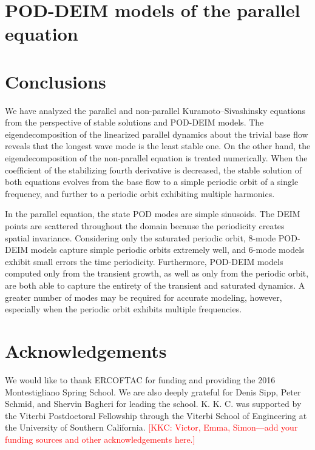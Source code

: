 \documentclass[11pt]{article}
\newcommand{\KSE}{Kuramoto--Sivashinsky equation}
\newcommand{\kkc}[1]{\textcolor{red}{[KKC: #1]}}
\begin{document}
\section{POD-DEIM models of the parallel equation}
\label{sec:pod-deim}

\section{Conclusions}
\label{sec:conclusions}

We have analyzed the parallel and non-parallel {\KSE}s from the perspective of stable solutions and POD-DEIM models.
The eigendecomposition of the linearized parallel dynamics about the trivial base flow reveals that the longest wave mode is the least stable one.
On the other hand, the eigendecomposition of the non-parallel equation is treated numerically.
When the coefficient of the stabilizing fourth derivative is decreased, the stable solution of both equations evolves from the base flow to a simple periodic orbit of a single frequency, and further to a periodic orbit exhibiting multiple harmonics.

In the parallel equation, the state POD modes are simple sinusoids.
The DEIM points are scattered throughout the domain because the periodicity creates spatial invariance.
Considering only the saturated periodic orbit, 8-mode POD-DEIM models capture simple periodic orbits extremely well, and 6-mode models exhibit small errors the time periodicity.
Furthermore, POD-DEIM models computed only from the transient growth, as well as only from the periodic orbit, are both able to capture the entirety of the transient and saturated dynamics.
A greater number of modes may be required for accurate modeling, however, especially when the periodic orbit exhibits multiple frequencies.

\section{Acknowledgements}

We would like to thank ERCOFTAC for funding and providing the 2016 Montestigliano Spring School.
We are also deeply grateful for Denis Sipp, Peter Schmid, and Shervin Bagheri for leading the school.
K. K. C. was supported by the Viterbi Postdoctoral Fellowship through the Viterbi School of Engineering at the University of Southern California.
\kkc{Victor, Emma, Simon---add your funding sources and other acknowledgements here.}


\end{document}

